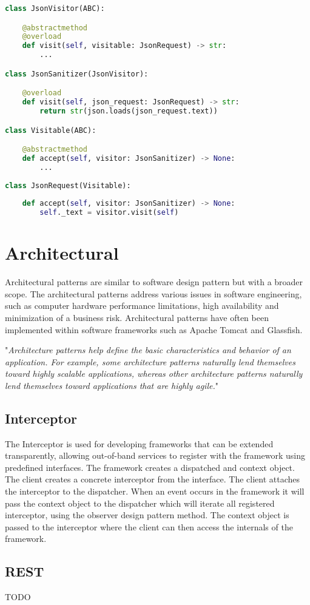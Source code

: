 \begin{lstlisting}[language=Python]
class JsonVisitor(ABC):

	@abstractmethod
	@overload
	def visit(self, visitable: JsonRequest) -> str:
		...

class JsonSanitizer(JsonVisitor):

	@overload
	def visit(self, json_request: JsonRequest) -> str:
		return str(json.loads(json_request.text))

class Visitable(ABC):

	@abstractmethod
	def accept(self, visitor: JsonSanitizer) -> None:
		...
	
class JsonRequest(Visitable):
	
	def accept(self, visitor: JsonSanitizer) -> None:
		self._text = visitor.visit(self)

\end{lstlisting}

\section{Architectural}
Architectural patterns are similar to software design pattern but with a broader scope. The architectural patterns address various issues in software engineering, such as computer hardware performance limitations, high availability and minimization of a business risk. Architectural patterns have often been implemented within software frameworks such as Apache Tomcat and Glassfish.

"\textit{Architecture patterns help define the basic characteristics and behavior of an application. For example, some architecture patterns naturally lend themselves toward highly scalable applications,
whereas other architecture patterns naturally lend themselves toward applications that are highly agile.}" \citep{patterns}

\subsection{Interceptor}
The Interceptor is used for developing frameworks that can be extended transparently, allowing out-of-band services to register with the framework using predefined interfaces. The framework creates  a dispatched and context object. The client creates a concrete interceptor from the interface. The client attaches the interceptor to the dispatcher. When an event occurs in the framework it will pass the context object to the dispatcher which will iterate all registered interceptor, using the observer design pattern method. The context object is passed to the interceptor where the client can then access the internals of the framework.

\subsection{REST}
TODO
